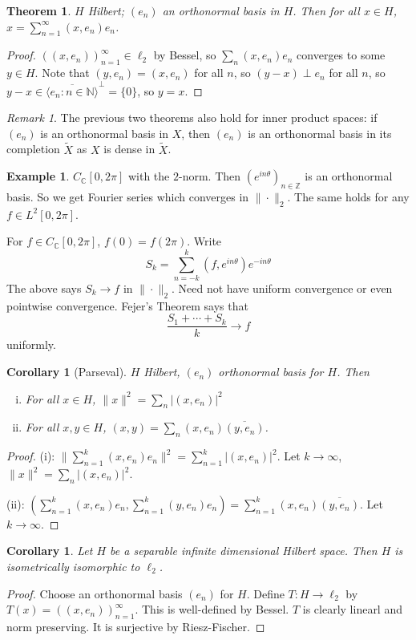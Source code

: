 \documentclass{article}
\theoremstyle{definition}
\newtheorem{example}[defn]{Example}
\theoremstyle{remark}
\newtheorem{rem}{Remark}
\theoremstyle{plain}
\newtheorem{thm}[defn]{Theorem}
\newtheorem{crly}[defn]{Corollary}
\newcommand{\NN}{\mathbb{N}}
\newcommand{\ZZ}{\mathbb{Z}}
\newcommand{\CC}{\mathbb{C}}
\begin{document}
\begin{thm}
    $H$ Hilbert; $(e_n)$ an orthonormal basis in $H$. Then for all $x\in H$, $x=\sum_{n=1}^\infty(x,e_n)e_n$.
\end{thm}
\begin{proof}
    $((x,e_n))_{n=1}^\infty\in\ell_2$ by Bessel, so $\sum_{n}(x,e_n)e_n$ converges to some $y\in H$. Note that $(y,e_n)=(x,e_n)$ for all $n$, so $(y-x)\perp e_n$ for all $n$, so $y-x\in \overline{\langle e_n:n\in\NN\rangle}^\perp=\{0\}$, so $y=x$.
\end{proof}
\begin{rem}
    The previous two theorems also hold for inner product spaces: if $(e_n)$ is an orthonormal basis in $X$, then $(e_n)$ is an orthonormal basis in its completion $\tilde X$ as $X$ is dense in $\tilde X$.
\end{rem}
\begin{example}
    $C_\CC[0,2\pi]$ with the $2$-norm. Then $(e^{in\theta})_{n\in \ZZ}$ is an orthonormal basis. So we get Fourier series which converges in $\|\cdot\|_2$. The same holds for any $f\in L^2[0,2\pi]$.

    For $f\in C_\CC[0,2\pi]$, $f(0)=f(2\pi)$. Write $$S_k=\sum_{n=-k}^k(f,e^{in\theta})e^{-in\theta}$$
    The above says $S_k\to f$ in $\|\cdot\|_2$. Need not have uniform convergence or even pointwise convergence. Fejer's Theorem says that 
    \[\dfrac{S_1+\cdots+S_k}{k}\to f\] uniformly.
\end{example}
\begin{crly}[Parseval]
    $H$ Hilbert, $(e_n)$ orthonormal basis for $H$. Then
    \begin{enumerate}[(i)]
        \item For all $x\in H$, $\|x\|^2=\sum_n|(x,e_n)|^2$
        \item For all $x,y\in H$, $(x,y)=\sum_n(x,e_n)\overline{(y,e_n)}$.
    \end{enumerate}
\end{crly}
\begin{proof}
    (i): $\|\sum_{n=1}^k(x,e_n)e_n\|^2=\sum_{n=1}^k|(x,e_n)|^2$. Let $k\to \infty$, $\|x\|^2=\sum_n|(x,e_n)|^2$.

    (ii): $(\sum_{n=1}^k(x,e_n)e_n,\sum_{n=1}^k(y,e_n)e_n)=\sum_{n=1}^k(x,e_n)\overline{(y,e_n)}$. Let $k\to\infty$.
\end{proof}
\begin{crly}
    Let $H$ be a separable infinite dimensional Hilbert space. Then $H$ is isometrically isomorphic to $\ell_2$.
\end{crly}
\begin{proof}
    Choose an orthonormal basis $(e_n)$ for $H$. Define $T:H\to \ell_2$ by $T(x)=((x,e_n))_{n=1}^\infty$.
    This is well-defined by Bessel. $T$ is clearly linearl and norm preserving. It is surjective by Riesz-Fischer.
\end{proof}
\end{document}

